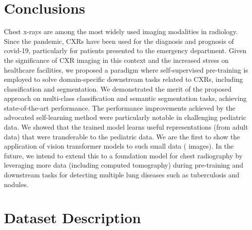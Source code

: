 \documentclass[10pt,journal,compsoc]{IEEEtran}
\begin{document}
\section{Conclusions}
Chest x-rays are among the most widely used imaging modalities in radiology. Since the pandemic, CXRs have been used for the diagnosis and prognosis of covid-19, particularly for patients presented to the emergency department. Given the significance of CXR imaging in this context and the increased stress on healthcare facilities, we proposed a paradigm where self-supervised pre-training is employed to solve domain-specific downstream tasks related to CXRs, including classification and segmentation. We demonstrated the merit of the proposed approach on multi-class classification and semantic segmentation tasks, achieving state-of-the-art performance. The performance improvements achieved by the advocated self-learning method were particularly notable in challenging pediatric data.
We showed that the trained model learns useful representations (from adult data) that were transferable to the pediatric data. We are the first to show the application of vision transformer models to such small data ( images).  In the future, we intend to extend this to a foundation model for chest radiography by leveraging more data (including computed tomography) during pre-training and downstream tasks for detecting multiple lung diseases such as tuberculosis and nodules.   








{\small


}
\newpage
\onecolumn
\appendix

\section{Dataset Description}
\end{document}
